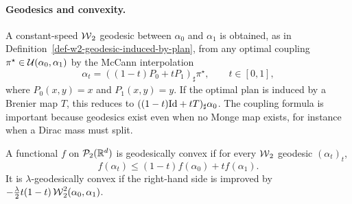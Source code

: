 \paragraph{Geodesics and convexity.}

A constant-speed $\operatorname{\mathcal{W}}_2$ geodesic between $\alpha_0$ and $\alpha_1$ is obtained, as in Definition~\ref{def-w2-geodesic-induced-by-plan}, from any optimal coupling $\pi^\star\in\mathcal{U}(\alpha_0,\alpha_1)$ by the McCann interpolation
\[
	\alpha_t=((1-t)P_0+tP_1)_\sharp\pi^\star,
	\qquad t\in[0,1],
\]
where $P_0(x,y)=x$ and $P_1(x,y)=y$. If the optimal plan is induced by a Brenier map $T$, this reduces to $((1-t)\mathrm{Id}+tT)_\sharp\alpha_0$. The coupling formula is important because geodesics exist even when no Monge map exists, for instance when a Dirac mass must split.

\begin{defn}\label{def-geodesic-convexity}
	A functional $f$ on $\mathcal{P}_2(\mathbb{R}^d)$ is geodesically convex if for every $\operatorname{\mathcal{W}}_2$ geodesic $(\alpha_t)_t$,
	\[
		f(\alpha_t)\leq (1-t)f(\alpha_0)+t f(\alpha_1).
	\]
	It is $\lambda$-geodesically convex if the right-hand side is improved by $-\frac{\lambda}{2}t(1-t)\operatorname{\mathcal{W}}_2^2(\alpha_0,\alpha_1)$.
\end{defn}

